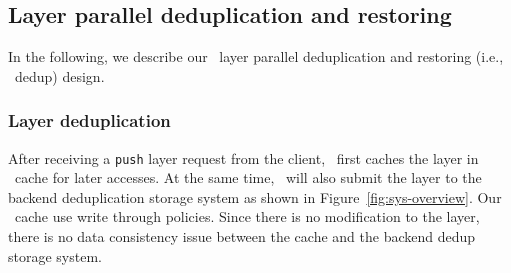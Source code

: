 \subsection{Layer parallel deduplication and restoring}
\label{sec:design_operations}

%
In the following, we describe our \sysname~layer parallel deduplication 
and restoring (i.e., \sysname~dedup) design. 


\subsubsection{Layer deduplication}
After receiving a \texttt{push} layer request from the client, 
\sysname~first caches the layer in \sysname~cache for later accesses.
At the same time, \sysname~will also submit the layer to the backend deduplication storage system as shown in Figure~\ref{fig:sys-overview}.
Our \sysname~cache use write through policies. 
Since there is no modification to the layer, 
there is no data consistency issue between the cache and the backend dedup storage system.


